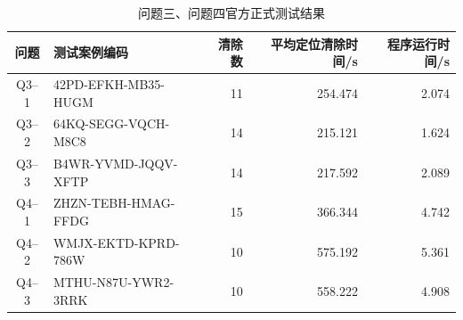﻿\begin{table}[!htbp]\centering\small
\caption{问题三、问题四官方正式测试结果}\label{tab:formal}
\begin{tabular}{clrrr}\toprule
问题&测试案例编码&清除数&平均定位清除时间/s&程序运行时间/s\\\midrule
Q3--1&42PD-EFKH-MB35-HUGM&11&254.474&2.074\\
Q3--2&64KQ-SEGG-VQCH-M8C8&14&215.121&1.624\\
Q3--3&B4WR-YVMD-JQQV-XFTP&14&217.592&2.089\\
Q4--1&ZHZN-TEBH-HMAG-FFDG&15&366.344&4.742\\
Q4--2&WMJX-EKTD-KPRD-786W&10&575.192&5.361\\
Q4--3&MTHU-N87U-YWR2-3RRK&10&558.222&4.908\\\bottomrule
\end{tabular}
\end{table}
